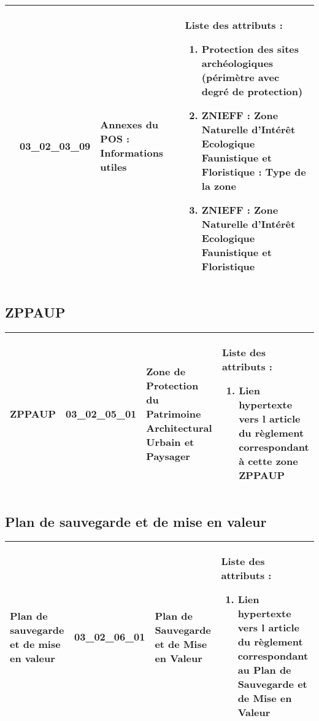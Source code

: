 \documentclass[12pt,titlepage]{book}
\begin{document}
\begin{supertabular}{|p{10cm}|c|p{13cm}|p{12cm}|}
\\


                    & 03\_02\_03\_09 & Annexes du POS : Informations utiles & Liste des attributs :
\begin{enumerate}
  \item Protection des sites archéologiques (périmètre avec degré de protection)  \item ZNIEFF : Zone Naturelle d'Intérêt Ecologique Faunistique et Floristique : Type de la zone  \item ZNIEFF : Zone Naturelle d'Intérêt Ecologique Faunistique et Floristique\end{enumerate}
\\
\hline
\end{supertabular}
\begin{figure}[h!]
  \hfill         %
\end{figure}


\subsection{ZPPAUP}
\noindent
\vspace{\baselineskip}

\renewcommand{\arraystretch}{1.2}
\begin{supertabular}{|p{10cm}|c|p{13cm}|p{12cm}|}
 ZPPAUP & 03\_02\_05\_01 & Zone de Protection du Patrimoine Architectural Urbain et Paysager & Liste des attributs :
\begin{enumerate}
  \item Lien hypertexte vers l article du règlement correspondant à cette zone ZPPAUP\end{enumerate}
\\
\hline
\end{supertabular}
\begin{figure}[h!]
  \hfill         %
\end{figure}


\subsection{Plan de sauvegarde et de mise en valeur}
\noindent
\vspace{\baselineskip}

\renewcommand{\arraystretch}{1.2}
\begin{supertabular}{|p{10cm}|c|p{13cm}|p{12cm}|}
 Plan de sauvegarde et de mise en valeur & 03\_02\_06\_01 & Plan de Sauvegarde et de Mise en Valeur & Liste des attributs :
\begin{enumerate}
  \item Lien hypertexte vers l article du règlement correspondant au Plan de Sauvegarde et de Mise en Valeur\end{enumerate}
\\
\hline
\end{supertabular}
\begin{figure}[h!]
  \hfill         %
\end{figure}
\end{document}
